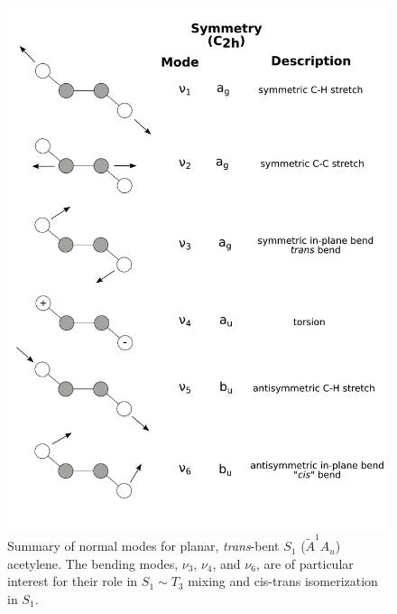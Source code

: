\begin{figure}
  \centering
  \includegraphics[width=5.8in]{s1-modes.pdf}
  \caption{Summary of normal modes for planar, \emph{trans}-bent $S_1$
    ($\tilde{A}^1A_u$) acetylene.  The bending modes, $\nu_3$,
    $\nu_4$, and $\nu_6$, are of particular interest for their role in
    $S_1 \sim T_3$ mixing and cis-trans isomerization in $S_1$.}
  \label{fig:modes}
\end{figure} 



